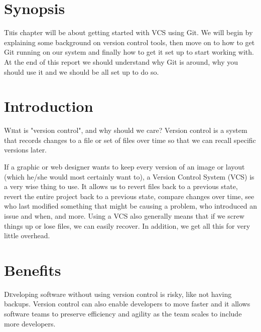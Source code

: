 \documentclass[twoside]{article}
\begin{document}
\begin{multicols}{2} %

\section{Synopsis}

\lettrine[nindent=0em,lines=3]{T}his chapter will be about getting started with VCS using Git. We will begin by explaining some background on version control tools, then move on to how to get Git running on our system and finally how to get it set up to start working with. At the end of this report we should understand why Git is around, why you should use it and we should be all set up to do so.




\section{Introduction}

\lettrine[nindent=0em,lines=3]{W}hat is "version control", and why should we care? Version control is a system that records changes to a file or set of files over time so that we can recall specific versions later. 

If a graphic or web designer wants to keep every version of an image or layout (which he/she would most certainly want to), a Version Control System (VCS) is a very wise thing to use. It allows us to revert files back to a previous state, revert the entire project back to a previous state, compare changes over time, see who last modified something that might be causing a problem, who introduced an issue and when, and more. Using a VCS also generally means that if we screw things up or lose files, we can easily recover. In addition, we get all this for very little overhead.


\section{Benefits}

\lettrine[nindent=0em,lines=3]{D}eveloping software without using version control is risky, like not having backups. Version control can also enable developers to move faster and it allows software teams to preserve efficiency and agility as the team scales to include more developers.


\end{multicols}
\end{document}
